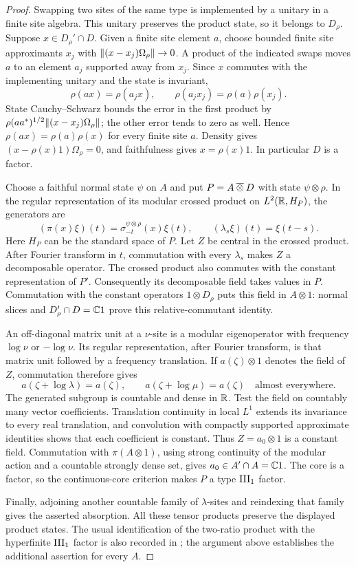 \begin{proof}
Swapping two sites of the same type is implemented by a unitary in a finite
site algebra.  This unitary preserves the product state, so it belongs to
$D_\rho$.  Suppose $x\in D_\rho'\cap D$.  Given a finite site element $a$,
choose bounded finite site approximants $x_j$ with
$\lVert(x-x_j)\Omega_\rho\rVert\to0$.  A product of the indicated swaps moves
$a$ to an element $a_j$ supported away from $x_j$.  Since $x$ commutes with
the implementing unitary and the state is invariant,
\[
 \rho(ax)=\rho(a_jx),\qquad
 \rho(a_jx_j)=\rho(a)\rho(x_j).
\]
State Cauchy--Schwarz bounds the error in the first product by
$\rho(aa^*)^{1/2}\lVert(x-x_j)\Omega_\rho\rVert$; the other error tends to zero
as well.  Hence $\rho(ax)=\rho(a)\rho(x)$ for every finite site $a$.
Density gives $(x-\rho(x)1)\Omega_\rho=0$, and faithfulness gives
$x=\rho(x)1$.  In particular $D$ is a factor.

Choose a faithful normal state $\psi$ on $A$ and put
$P=A\mathbin{\overline\otimes} D$ with state $\psi\otimes\rho$.  In the regular
representation of its modular crossed product on $L^2(\mathbb R,H_P)$, the
generators are
\[
 (\pi(x)\xi)(t)=\sigma^{\psi\otimes\rho}_{-t}(x)\xi(t),
 \qquad (\lambda_s\xi)(t)=\xi(t-s).
\]
Here $H_P$ can be the standard space of $P$.  Let $Z$ be central in the
crossed product.  After Fourier transform in $t$, commutation with every
$\lambda_s$ makes $Z$ a decomposable operator.  The crossed product also
commutes with the constant representation of $P'$.  Consequently its
decomposable field takes values in $P$.  Commutation with the constant
operators $1\otimes D_\rho$ puts this field in $A\otimes1$: normal slices
and $D_\rho'\cap D=\mathbb C1$ prove this relative-commutant identity.

An off-diagonal matrix unit at a $\nu$-site is a modular eigenoperator
with frequency $\log\nu$ or $-\log\nu$.  Its regular representation,
after Fourier transform, is that matrix unit followed by a frequency
translation.  If $a(\zeta)\otimes1$ denotes the field of $Z$, commutation
therefore gives
\[
 a(\zeta+\log\lambda)=a(\zeta),\qquad
 a(\zeta+\log\mu)=a(\zeta)
 \quad\text{almost everywhere}.
\]
The generated subgroup is countable and dense in $\mathbb R$.  Test the field on
countably many vector coefficients.  Translation continuity in local
$L^1$ extends its invariance to every real translation, and convolution
with compactly supported approximate identities shows that each
coefficient is constant.  Thus $Z=a_0\otimes1$ is a constant field.
Commutation with $\pi(A\otimes1)$, using strong continuity of the modular
action and a countable strongly dense set, gives $a_0\in A'\cap A=\mathbb C1$.
The core is a factor, so the continuous-core criterion makes $P$ a type
$\mathrm{III}_1$ factor.

Finally, adjoining another countable family of $\lambda$-sites and
reindexing that family gives the asserted absorption.  All these tensor
products preserve the displayed product states.  The usual identification
of the two-ratio product with the hyperfinite $\mathrm{III}_1$ factor is also
recorded in \cite[Example~1.6, p.~103]{Haagerup1987}; the argument above
establishes the additional assertion for every $A$.
\end{proof}


